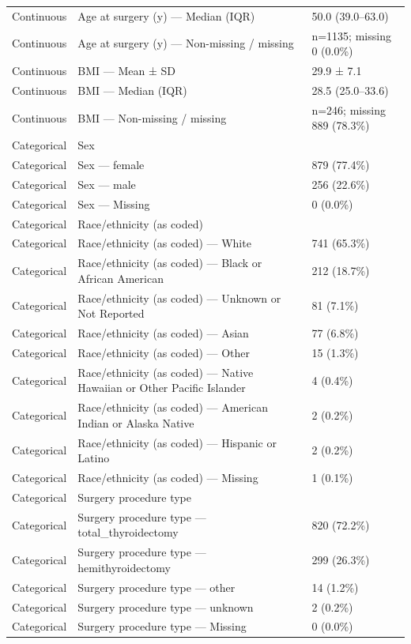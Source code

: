 \begin{table}[htbp]
\begin{tabular}{lll}
Continuous & Age at surgery (y) — Median (IQR) & 50.0 (39.0–63.0) \\
Continuous & Age at surgery (y) — Non-missing / missing & n=1135; missing 0 (0.0\%) \\
Continuous & BMI — Mean ± SD & 29.9 ± 7.1 \\
Continuous & BMI — Median (IQR) & 28.5 (25.0–33.6) \\
Continuous & BMI — Non-missing / missing & n=246; missing 889 (78.3\%) \\
Categorical & Sex &  \\
Categorical & Sex — female & 879 (77.4\%) \\
Categorical & Sex — male & 256 (22.6\%) \\
Categorical & Sex — Missing & 0 (0.0\%) \\
Categorical & Race/ethnicity (as coded) &  \\
Categorical & Race/ethnicity (as coded) — White & 741 (65.3\%) \\
Categorical & Race/ethnicity (as coded) — Black or African American & 212 (18.7\%) \\
Categorical & Race/ethnicity (as coded) — Unknown or Not Reported & 81 (7.1\%) \\
Categorical & Race/ethnicity (as coded) — Asian & 77 (6.8\%) \\
Categorical & Race/ethnicity (as coded) — Other & 15 (1.3\%) \\
Categorical & Race/ethnicity (as coded) — Native Hawaiian or Other Pacific Islander & 4 (0.4\%) \\
Categorical & Race/ethnicity (as coded) — American Indian or Alaska Native & 2 (0.2\%) \\
Categorical & Race/ethnicity (as coded) — Hispanic or Latino & 2 (0.2\%) \\
Categorical & Race/ethnicity (as coded) — Missing & 1 (0.1\%) \\
Categorical & Surgery procedure type &  \\
Categorical & Surgery procedure type — total\_thyroidectomy & 820 (72.2\%) \\
Categorical & Surgery procedure type — hemithyroidectomy & 299 (26.3\%) \\
Categorical & Surgery procedure type — other & 14 (1.2\%) \\
Categorical & Surgery procedure type — unknown & 2 (0.2\%) \\
Categorical & Surgery procedure type — Missing & 0 (0.0\%) \\

\end{tabular}
\end{table}
